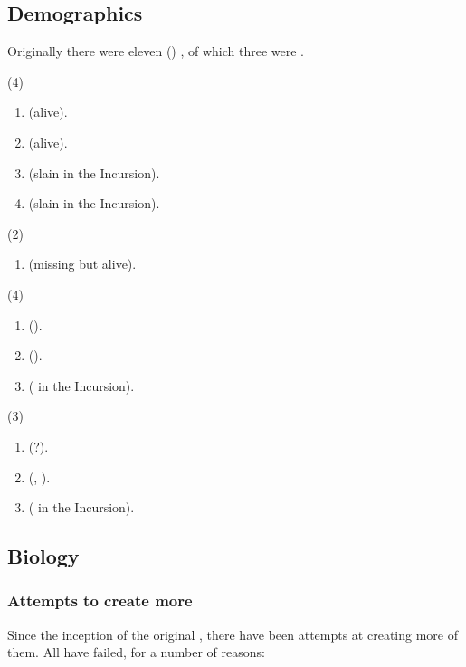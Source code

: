 \subsection{Demographics}
Originally there were eleven () \satharioth{}, of which three were \resviel. 
\begin{gloss}
  \gitem{\KiriathSepher} (4)
  \begin{enumerate}
    \item {} (alive). 
    \item {} (alive). 
    \item {} (slain in the Incursion). 
    \item {} (slain in the Incursion). 
  \end{enumerate}
  \gitem{\Kezerad} (2)
  \begin{enumerate}
    \item {} (missing but alive). 
  \end{enumerate}
  \gitem{\Mystraacht} (4)
  \begin{enumerate}
    \item {}  (\Malach). 
    \item {} (\Malach). 
    \item {} ( in the Incursion). 
  \end{enumerate}
  \gitem{\TiphredSerah} (3)
  \begin{enumerate}
    \item {} (?). 
    \item {} (\Malach, ). 
    \item {} ( in the Incursion). 
  \end{enumerate}
\end{gloss}










\subsection{Biology}
\subsubsection{Attempts to create more \satharioth}
Since the inception of the original \satharioth, there have been attempts at creating more of them. 
All have failed, for a number of reasons:

